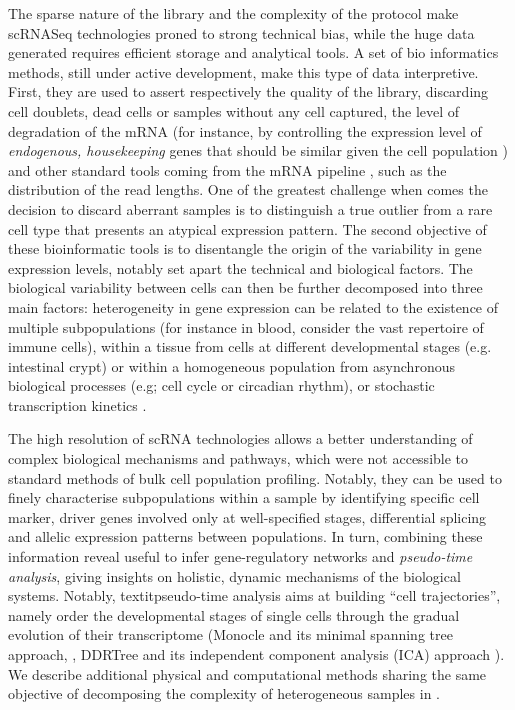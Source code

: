 The sparse nature of the library and the complexity of the protocol make scRNASeq technologies proned to strong technical bias, while the huge data generated requires efficient storage and analytical tools. A set of bio informatics methods, still under active development, make this type of data interpretive. First, they are used to assert respectively the quality of the library, discarding cell doublets, dead cells or samples without any cell captured, the level of degradation of the mRNA (for instance, by controlling the expression level of \textit{endogenous, housekeeping} genes that should be similar given the cell population \autocite{shalek_etal14}) and other standard tools coming from the mRNA pipeline , such as the distribution of the read lengths. One of the greatest challenge when comes the decision to discard aberrant samples is to distinguish a true outlier from a rare cell type that presents an atypical expression pattern. The second objective of these bioinformatic tools is to disentangle the origin of the variability in gene expression levels, notably set apart the technical and biological factors. The biological variability between cells can then be further decomposed into three main factors: heterogeneity in gene expression can be related to the existence of multiple subpopulations (for instance in blood, consider the vast repertoire of immune cells), within a tissue from cells at different developmental stages (e.g. intestinal crypt) or within a homogeneous population from asynchronous biological processes (e.g; cell cycle or circadian rhythm), or stochastic transcription kinetics \autocite{buettner_etal15}. 

The high resolution of scRNA technologies allows a better understanding of complex biological mechanisms and pathways, which were not accessible to standard methods of bulk cell population profiling. Notably, they can be used to finely characterise subpopulations within a sample by identifying specific \gls{cell marker}, driver genes involved only at well-specified stages, differential splicing and allelic expression patterns between populations. In turn, combining these information reveal useful to infer gene-regulatory networks and \textit{pseudo-time analysis}, giving insights on holistic, dynamic mechanisms of the biological systems. Notably, textit{pseudo-time analysis} aims at building \enquote{cell trajectories}, namely order the developmental stages of single cells through the gradual evolution of their transcriptome (Monocle and its minimal spanning tree approach, \autocite{trapnell_etal14},  DDRTree and its independent component analysis (ICA) approach \autocite{qiu_etal17}). We describe additional physical and computational methods sharing the same objective of decomposing the complexity of heterogeneous samples in .

